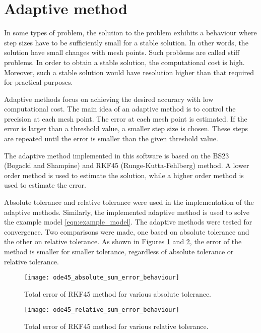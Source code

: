 \section{Adaptive method}
\label{sec:adaptive-method}
In some types of problem, the solution to the problem exhibits a behaviour where step sizes have to be sufficiently small for a stable solution. In other words, the solution have small changes with mesh points. Such problems are called stiff problems. In order to obtain a stable solution, the computational cost is high. Moreover, such a stable solution would have resolution higher than that required for practical purposes.

Adaptive methods focus on achieving the desired accuracy with low computational cost. The main idea of an adaptive method is to control the precision at each mesh point. The error at each mesh point is estimated. If the error is larger than a threshold value, a smaller step size is chosen. These steps are repeated until the error is smaller than the given threshold value.

The adaptive method implemented in this software is based on the BS23 (Bogacki and Shampine) and RKF45 (Runge-Kutta-Fehlberg) method. A lower order method is used to estimate the solution, while a higher order method is used to estimate the error. 

Absolute tolerance and relative tolerance were used in the implementation of the adaptive methods. Similarly, the implemented adaptive method is used to solve the example model \ref{eqn:example_model}. The adaptive methods were tested for convergence. Two comparisons were made, one based on absolute tolerance and the other on relative tolerance. As shown in Figures \ref{fig:ode45_absolute_sum_error_behaviour} and \ref{fig:ode45_relative_sum_error_behaviour}, the error of the method is smaller for smaller tolerance, regardless of absolute tolerance or relative tolerance.

\begin{figure}
    \texttt{[image: ode45\_absolute\_sum\_error\_behaviour]}
    \caption{Total error of RKF45 method for various absolute tolerance.}
    \label{fig:ode45_absolute_sum_error_behaviour}
\end{figure}

\begin{figure}
    \texttt{[image: ode45\_relative\_sum\_error\_behaviour]}
    \caption{Total error of RKF45 method for various relative tolerance.}
    \label{fig:ode45_relative_sum_error_behaviour}
\end{figure}